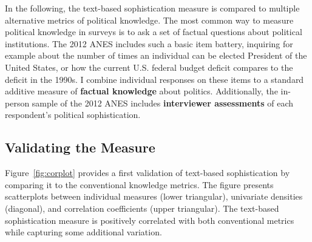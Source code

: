 \documentclass[12pt]{article}
\begin{document}
In the following, the text-based sophistication measure is compared to multiple alternative metrics of political knowledge. The most common way to measure political knowledge in surveys is to ask a set of factual questions about political institutions. The 2012 ANES includes such a basic item battery, inquiring for example about the number of times an individual can be elected President of the United States, or how the current U.S. federal budget deficit compares to the deficit in the 1990s. I combine individual responses on these items to a standard additive measure of \textbf{factual knowledge} about politics. Additionally, the in-person sample of the 2012 ANES includes \textbf{interviewer assessments} of each respondent's political sophistication.

\subsection*{Validating the Measure}

Figure~\ref{fig:corplot} provides a first validation of text-based sophistication by comparing it to the conventional knowledge metrics. The figure presents scatterplots between individual measures (lower triangular), univariate densities (diagonal), and correlation coefficients (upper triangular). The text-based sophistication measure is positively correlated with both conventional metrics while capturing some additional variation.
\end{document}
